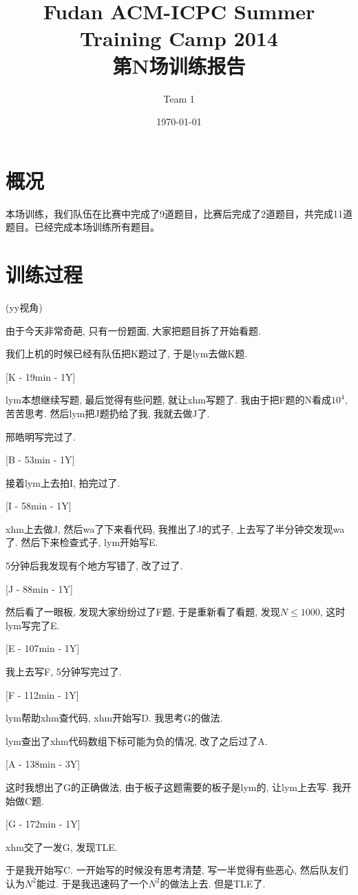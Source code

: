 \documentclass[a4paper, 11pt, nofonts, nocap, fancyhdr]{ctexart}
\title{Fudan ACM-ICPC Summer Training Camp 2014\\第N场训练报告}
\author{Team 1}
\date{\today}
\begin{document}
\maketitle

\section{概况}

本场训练，我们队伍在比赛中完成了9道题目，比赛后完成了2道题目，共完成11道题目。已经完成本场训练所有题目。


\section{训练过程}

(yy视角)

由于今天非常奇葩, 只有一份题面, 大家把题目拆了开始看题.

我们上机的时候已经有队伍把K题过了, 于是lym去做K题.

[K - 19min - 1Y]

lym本想继续写题, 最后觉得有些问题, 就让xhm写题了. 我由于把F题的N看成$10^4$, 苦苦思考. 然后lym把J题扔给了我, 我就去做J了.

邢皓明写完过了.

[B - 53min - 1Y]

接着lym上去拍I, 拍完过了.

[I - 58min - 1Y]

xhm上去做J, 然后wa了下来看代码, 我推出了J的式子, 上去写了半分钟交发现wa了. 然后下来检查式子, lym开始写E.

5分钟后我发现有个地方写错了, 改了过了.

[J - 88min - 1Y]

然后看了一眼板, 发现大家纷纷过了F题, 于是重新看了看题, 发现$N \leq 1000$, 这时lym写完了E.

[E - 107min - 1Y]

我上去写F, 5分钟写完过了.

[F - 112min - 1Y]

lym帮助xhm查代码, xhm开始写D. 我思考G的做法.

lym查出了xhm代码数组下标可能为负的情况, 改了之后过了A.

[A - 138min - 3Y]

这时我想出了G的正确做法, 由于板子这题需要的板子是lym的, 让lym上去写. 我开始做C题.

[G - 172min - 1Y]

xhm交了一发G, 发现TLE.

于是我开始写C. 一开始写的时候没有思考清楚, 写一半觉得有些恶心, 然后队友们认为$N^2$能过. 于是我迅速码了一个$N^2$的做法上去. 但是TLE了.
\end{document}
